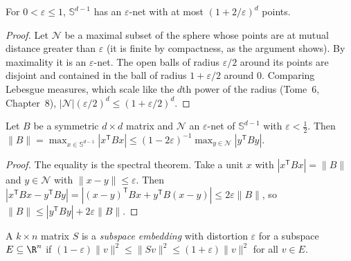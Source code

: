 \begin{lemma}\label{lem:netsize}
For $0<\varepsilon\le1$, $\mathbb S^{d-1}$ has an $\varepsilon$-net with at most $(1+2/\varepsilon)^d$ points.
\end{lemma}
\begin{proof}
Let $\mathcal N$ be a maximal subset of the sphere whose points are at mutual distance greater than $\varepsilon$ (it is finite by compactness, as the argument shows). By maximality
it is an $\varepsilon$-net. The open balls of radius $\varepsilon/2$ around its points are disjoint and contained in the ball of radius $1+\varepsilon/2$ around $0$. Comparing
Lebesgue measures, which scale like the $d$th power of the radius (Tome~6, Chapter~8), $|\mathcal N|(\varepsilon/2)^d\le(1+\varepsilon/2)^d$.
\end{proof}

\begin{lemma}\label{lem:netnorm}
Let $B$ be a symmetric $d\times d$ matrix and $\mathcal N$ an $\varepsilon$-net of $\mathbb S^{d-1}$ with $\varepsilon<\frac12$. Then
$\|B\|=\max_{x\in\mathbb S^{d-1}}|x^{\mathsf T}Bx|\le(1-2\varepsilon)^{-1}\max_{y\in\mathcal N}|y^{\mathsf T}By|$.
\end{lemma}
\begin{proof}
The equality is the spectral theorem. Take a unit $x$ with $|x^{\mathsf T}Bx|=\|B\|$ and $y\in\mathcal N$ with $\|x-y\|\le\varepsilon$. Then
$|x^{\mathsf T}Bx-y^{\mathsf T}By|=|(x-y)^{\mathsf T}Bx+y^{\mathsf T}B(x-y)|\le2\varepsilon\|B\|$, so $\|B\|\le|y^{\mathsf T}By|+2\varepsilon\|B\|$.
\end{proof}

\begin{definition}\label{def:embedding}
A $k\times n$ matrix $S$ is a \emph{subspace embedding} with distortion $\varepsilon$ for a subspace $E\subseteq\R^n$ if $(1-\varepsilon)\|v\|^2\le\|Sv\|^2\le(1+\varepsilon)\|v\|^2$ for all $v\in E$.
\end{definition}

